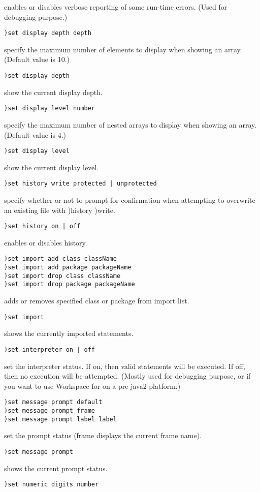 enables or disables verbose reporting of some run-time errors. (Used for debugging purpose.)
\begin{verbatim}
)set display depth depth
\end{verbatim}
specify the maximum number of elements to display when showing an array. (Default value is 10.)
\begin{verbatim}
)set display depth
\end{verbatim}
show the current display depth.
\begin{verbatim}
)set display level number
\end{verbatim}
specify the maximum number of nested arrays to display when showing an array. (Default value is 4.)
\begin{verbatim}
)set display level
\end{verbatim}
show the current display level.
\begin{verbatim}
)set history write protected | unprotected
\end{verbatim}
specify whether or not to prompt for confirmation when attempting to overwrite an existing file with )history )write.
\begin{verbatim}
)set history on | off
\end{verbatim}
enables or disables history.
\begin{verbatim}
)set import add class className
)set import add package packageName
)set import drop class className
)set import drop package packageName
\end{verbatim}
adds or removes specified class or package from import list.
\begin{verbatim}
)set import
\end{verbatim}
shows the currently imported statements.
\begin{verbatim}
)set interpreter on | off
\end{verbatim}
set the interpreter status. If on, then valid statements will be executed. If off, then no execution will be attempted. (Mostly used for debugging purpose, or if you want to use Workspace for \nr{} on a pre-java2 platform.)
\begin{verbatim}
)set message prompt default
)set message prompt frame
)set message prompt label label
\end{verbatim}
set the prompt status (frame displays the current frame name).
\begin{verbatim}
)set message prompt
\end{verbatim}
shows the current prompt status.
\begin{verbatim}
)set numeric digits number
\end{verbatim}
